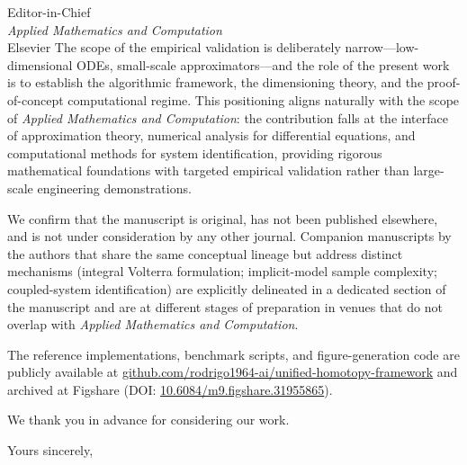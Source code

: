 \documentclass[11pt]{letter}
\begin{document}
\begin{letter}{Editor-in-Chief \\ \emph{Applied Mathematics and Computation} \\ Elsevier}
The scope of the empirical validation is deliberately narrow---low-dimensional
ODEs, small-scale approximators---and the role of the present work is to
establish the algorithmic framework, the dimensioning theory, and the
proof-of-concept computational regime. This positioning aligns naturally
with the scope of \emph{Applied Mathematics and Computation}: the
contribution falls at the interface of approximation theory, numerical
analysis for differential equations, and computational methods for system
identification, providing rigorous mathematical foundations with targeted
empirical validation rather than large-scale engineering demonstrations.

We confirm that the manuscript is original, has not been published
elsewhere, and is not under consideration by any other journal. Companion
manuscripts by the authors that share the same conceptual lineage but
address distinct mechanisms (integral Volterra formulation; implicit-model
sample complexity; coupled-system identification) are explicitly delineated
in a dedicated section of the manuscript and are at different stages of
preparation in venues that do not overlap with \emph{Applied Mathematics
and Computation}.

The reference implementations, benchmark scripts, and figure-generation
code are publicly available at
\href{https://github.com/rodrigo1964-ai/unified-homotopy-framework}{github.com/rodrigo1964-ai/unified-homotopy-framework}
and archived at Figshare (DOI:
\href{https://doi.org/10.6084/m9.figshare.31955865}{10.6084/m9.figshare.31955865}).

We thank you in advance for considering our work.

\closing{Yours sincerely,}

\end{letter}
\end{document}
